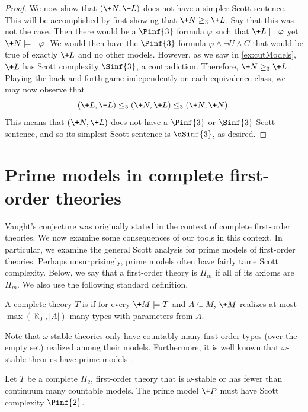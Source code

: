 \documentclass{amsart}
\renewcommand{\-}{\text{-}}
\begin{document}
\begin{proof}
We now show that $(\+N,\+L)$ does not have a simpler Scott sentence.
This will be accomplished by first showing that $\+N\geq_3 \+L$.
Say that this was not the case.
Then there would be a $\Pinf{3}$ formula $\varphi$ such that $\+L\models\varphi$ yet $\+N\models \lnot \varphi$.
We would then have the $\Pinf{3}$ formula $\varphi\land\lnot U\land C$ that would be true of exactly $\+L$ and no other models.
However, as we saw in \cref{ex:cutModels}, $\+L$ has Scott complexity $\Sinf{3}$, a contradiction.
Therefore, $\+N\geq_3 \+L$.
Playing the back-and-forth game independently on each equivalence class, we may now observe that
\[(\+L,\+L)\leq_3(\+N,\+L)\leq_3(\+N,\+N).\]
This means that $(\+N,\+L)$ does not have a $\Pinf{3}$ or $\Sinf{3}$ Scott sentence, and so its simplest Scott sentence is $\dSinf{3}$, as desired.
\end{proof}

\section{Prime models in complete first-order theories}
Vaught's conjecture was originally stated in the context of complete first-order theories.
We now examine some consequences of our tools in this context.
In particular, we examine the general Scott analysis for prime models of first-order theories.
Perhaps unsurprisingly, prime models often have fairly tame Scott complexity.
Below, we say that a first-order theory is $\Pi_m$ if all of its axioms are $\Pi_m$.
We also use the following standard definition.

\begin{definition}
    A complete theory $T$ is  if for every $\+M\models T$ and $A\subseteq M$, $\+M$ realizes at most $\max(\aleph_0,|A|)$ many types with parameters from $A$. 
\end{definition}

Note that $\omega$-stable theories only have countably many first-order types (over the empty set) realized among their models.
Furthermore, it is well known that $\omega$-stable theories have prime models \cite[Chapter 7]{marker2002}.

\begin{proposition}\label{prop:Pi2PrimeModel}
Let $T$ be a complete $\Pi_2$, first-order theory that is $\omega$-stable or has fewer than continuum many countable models.
The prime model $\+P$ must have Scott complexity $\Pinf{2}$.
\end{proposition}
\end{document}
